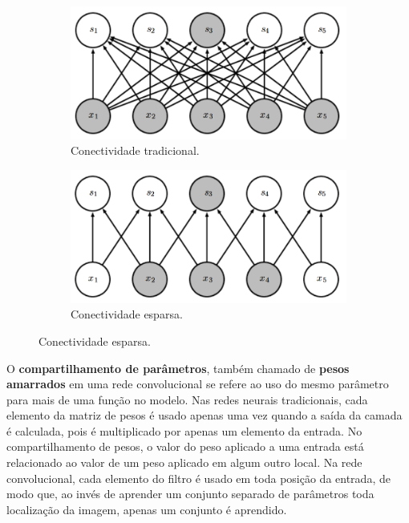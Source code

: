 \begin{figure}[htp]
\begin{subfigure}{.5\textwidth}
  \centering
  \includegraphics[width=.9\linewidth]{fig/full_conections}
  \caption{Conectividade tradicional.}
  \label{fig:full}
\end{subfigure}%
\begin{subfigure}{.5\textwidth}
  \centering
  \includegraphics[width=.9\linewidth]{fig/sparse_conections}
  \caption{Conectividade esparsa.}
  \label{fig:sparse}
\end{subfigure}
\end{figure}

O \textbf{compartilhamento de parâmetros}, também chamado de \textbf{pesos amarrados} 
em uma rede convolucional se refere ao uso do mesmo parâmetro para mais de uma função no modelo.
Nas redes neurais tradicionais, cada elemento da matriz de pesos é usado apenas uma vez quando a
saída da camada é calculada, pois é multiplicado por apenas um elemento da entrada. No compartilhamento
de pesos, o valor do peso aplicado a uma entrada está relacionado ao valor de um peso aplicado em
algum outro local. Na rede convolucional, cada elemento do filtro é usado em toda posição da entrada,
de modo que, ao invés de aprender um conjunto separado de parâmetros toda localização da imagem, apenas
um conjunto é aprendido.

